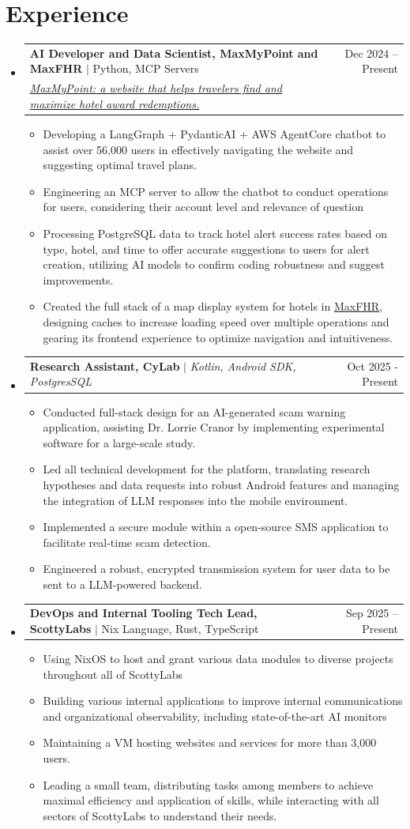 \documentclass[letterpaper,11pt]{article}
\makeatletter
\newcommand{\resumeItem}[1]{
  \item\small{
    {#1 \vspace{-2pt}}
  }
}
\newcommand{\resumeProjectLinkHeading}[3]{
    \item
    \begin{tabular*}{0.97\textwidth}{l@{\extracolsep{\fill}}r}
      \small#1 & #2 \\
      \small#3 \\
    \end{tabular*}\vspace{-7pt}
}
\newcommand{\resumeSmallJob}[2]{
    \item
    \begin{tabular*}{0.97\textwidth}{l@{\extracolsep{\fill}}r}
      \small#1 & #2 \\
    \end{tabular*}\vspace{-7pt}
}
\newcommand{\resumeSubHeadingListStart}{\begin{itemize}[leftmargin=0.15in, label={}]}
\newcommand{\resumeSubHeadingListEnd}{\end{itemize}}
\newcommand{\resumeItemListStart}{\begin{itemize}}
\newcommand{\resumeItemListEnd}{\end{itemize}\vspace{-5pt}}
\makeatother
\begin{document}
\section{Experience}
    \resumeSubHeadingListStart
        \resumeProjectLinkHeading
              {\textbf{AI Developer and Data Scientist, MaxMyPoint and MaxFHR} $|$ Python, MCP Servers}{Dec 2024 -- Present}
            {\href{https://maxmypoint.com/}{\textit{\underline{MaxMyPoint}: a website that helps travelers find and maximize hotel award redemptions.}}}
              \resumeItemListStart
                \resumeItem{Developing a LangGraph + PydanticAI + AWS AgentCore chatbot to assist over 56,000 users in effectively navigating the website and suggesting optimal travel plans.}
                \resumeItem{Engineering an MCP server to allow the chatbot to conduct operations for users, considering their account level and relevance of question}
                \resumeItem{Processing PostgreSQL data to track hotel alert success rates based on type, hotel, and time to offer accurate suggestions to users for alert creation, utilizing AI models to confirm coding robustness and suggest improvements.}
                \resumeItem{Created the full stack of a map display system for hotels in \href{https://maxfhr.com/}{\underline{MaxFHR}}, designing caches to increase loading speed over multiple operations and gearing its frontend experience to optimize navigation and intuitiveness.}
              \resumeItemListEnd
          
        \resumeSmallJob
        {\textbf{Research Assistant, CyLab} $|$ \emph{Kotlin, Android SDK, PostgresSQL}}{Oct 2025 - Present}
          \resumeItemListStart
            \resumeItem{Conducted full-stack design for an AI-generated scam warning application, assisting Dr. Lorrie Cranor by implementing experimental software for a large-scale study.}
            \resumeItem{Led all technical development for the platform, translating research hypotheses and data requests into robust Android features and managing the integration of LLM responses into the mobile environment.}
            \resumeItem{Implemented a secure module within a open-source SMS application to facilitate real-time scam detection.}
            \resumeItem{Engineered a robust, encrypted transmission system for user data to be sent to a LLM-powered backend.}
          \resumeItemListEnd
          
        \resumeSmallJob
          {\textbf{DevOps and Internal Tooling Tech Lead, ScottyLabs} $|$ Nix Language, Rust, TypeScript}{Sep 2025 -- Present}
          \resumeItemListStart
            \resumeItem{Using NixOS to host and grant various data modules to diverse projects throughout all of ScottyLabs}
            \resumeItem{Building various internal applications to improve internal communications and organizational observability, including state-of-the-art AI monitors}
            \resumeItem{Maintaining a VM hosting websites and services for more than 3,000 users.}
            \resumeItem{Leading a small team, distributing tasks among members to achieve maximal efficiency and application of skills, while interacting with all sectors of ScottyLabs to understand their needs.}
          \resumeItemListEnd
    \resumeSubHeadingListEnd
\end{document}
